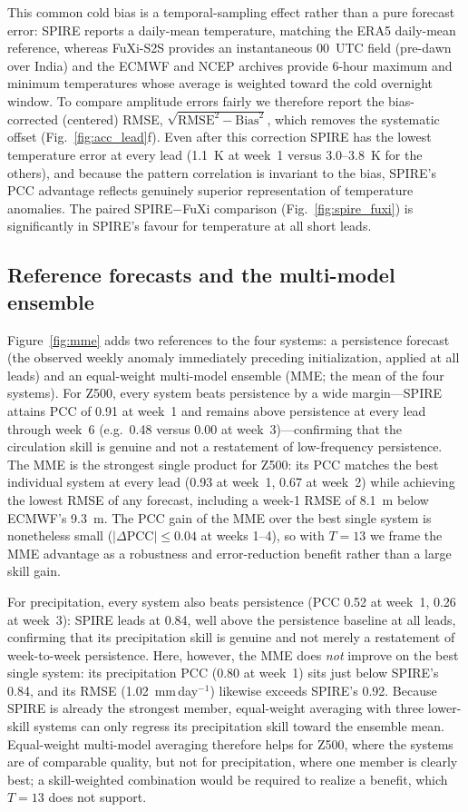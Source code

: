 \documentclass[11pt]{article}
\begin{document}
This common cold bias is a temporal-sampling effect rather than a pure
forecast error: SPIRE reports a daily-mean temperature, matching the
ERA5 daily-mean reference, whereas FuXi-S2S provides an instantaneous
00~UTC field (pre-dawn over India) and the ECMWF and NCEP archives
provide 6-hour maximum and minimum temperatures whose average is
weighted toward the cold overnight window. To compare amplitude errors
fairly we therefore report the bias-corrected (centered) RMSE,
$\sqrt{\mathrm{RMSE}^2-\mathrm{Bias}^2}$, which removes the systematic
offset (Fig.~\ref{fig:acc_lead}f). Even after this correction SPIRE has
the lowest temperature error at every lead (1.1~K at week~1 versus
3.0--3.8~K for the others), and because the pattern correlation is
invariant to the bias, SPIRE's PCC advantage reflects genuinely superior
representation of temperature anomalies. The paired SPIRE$-$FuXi
comparison (Fig.~\ref{fig:spire_fuxi}) is significantly in SPIRE's favour
for temperature at all short leads.

\subsection{Reference forecasts and the multi-model ensemble}
\label{sec:mme}

Figure~\ref{fig:mme} adds two references to the four systems: a
persistence forecast (the observed weekly anomaly immediately preceding
initialization, applied at all leads) and an equal-weight multi-model
ensemble (MME; the mean of the four systems). For Z500, every system
beats persistence by a wide margin---SPIRE attains PCC of 0.91 at week~1
and remains above persistence at every lead through week~6 (e.g.\ 0.48
versus 0.00 at week~3)---confirming that the circulation skill is
genuine and not a restatement of low-frequency persistence. The MME is
the strongest single product for Z500: its PCC matches the best
individual system at every lead (0.93 at week~1, 0.67 at week~2) while
achieving the lowest RMSE of any forecast, including a week-1 RMSE of
8.1~m below ECMWF's 9.3~m. The PCC gain of the MME over the best single
system is nonetheless small ($|\Delta\mathrm{PCC}|\leq0.04$ at weeks
1--4), so with $T=13$ we frame the MME advantage as a robustness and
error-reduction benefit rather than a large skill gain.

For precipitation, every system also beats persistence (PCC 0.52 at
week~1, 0.26 at week~3): SPIRE leads at 0.84, well above the persistence
baseline at all leads, confirming that its precipitation skill is
genuine and not merely a restatement of week-to-week persistence. Here,
however, the MME does \emph{not} improve on the best single system: its
precipitation PCC (0.80 at week~1) sits just below SPIRE's 0.84, and its
RMSE (1.02~mm\,day$^{-1}$) likewise exceeds SPIRE's 0.92. Because SPIRE is
already the strongest member, equal-weight averaging with three
lower-skill systems can only regress its precipitation skill toward the
ensemble mean. Equal-weight multi-model averaging therefore helps for
Z500, where the systems are of comparable quality, but not for
precipitation, where one member is clearly best; a skill-weighted
combination would be required to
realize a benefit, which $T=13$ does not support.
\end{document}
